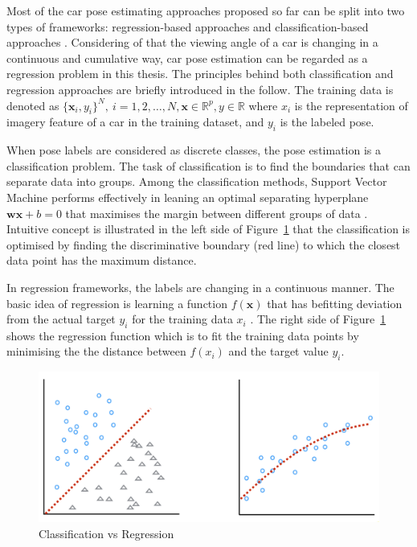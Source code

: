 \documentclass{tutmscthesis}[2010/09/22]
\numberwithin{equation}{section}
\numberwithin{table}{section}
\numberwithin{figure}{section}
\renewcommand{\vec}[1]{\bm{#1}}
\begin{document}
Most of the car pose estimating approaches proposed so far can be split into two types of frameworks: regression-based approaches \cite{torki2011regression, fenzi2013class, hara2014growing} and classification-based approaches \cite{ozuysal2009pose, glasner2011viewpoint}. 
Considering of that the viewing angle of a car is changing in a continuous and cumulative way, car pose estimation can be regarded as a regression problem in this thesis.
The principles behind both classification and regression approaches are briefly introduced in the follow. 
The training data is denoted as $\{\vec{x}_{i}, y_{i}\}^N,~i=1, 2, \ldots,N, \vec{x} \in \mathbb{R}^p, {y} \in \mathbb{R}$ where $x_i$ is the representation of imagery feature of a car in the training dataset, and $y_i$ is the labeled pose. 

\vspace{0.1cm}  When pose labels are considered as discrete classes, the pose estimation is a classification problem\cite{guo08icpr}. 
The task of classification is to find the boundaries that can separate data into groups.
Among the classification methods, Support Vector Machine performs effectively in leaning an optimal separating hyperplane $\vec{w}\vec{x} + {b} = 0$ that maximises the margin between different groups of data \cite{guo08icpr}. 
Intuitive concept is illustrated in the left side of Figure~\ref{Fig:classificationandregression} that the classification is optimised by finding the discriminative boundary (red line) to which the closest data point has the maximum distance. 

\vspace{0.1cm}  In regression frameworks, the labels are changing in a continuous manner. 
The basic idea of regression is learning a function $f(\vec{x})$ that has befitting deviation from the actual target $y_i$ for the training data $x_i$ \cite{guo08icpr}. 
The right side of Figure~\ref{Fig:classificationandregression} shows the regression function which is to fit the training data points by minimising the the distance between $f(x_i)$ and the target value $y_i$.


\begin{figure}[h]
\centering
\includegraphics[width=0.98\linewidth]{classandregress.png}
\caption{Classification vs Regression}
\label{Fig:classificationandregression} %
\end{figure}
\end{document}
